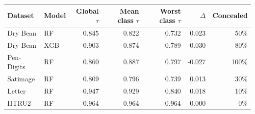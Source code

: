 \begin{tabular}{llrrrrr}
\toprule
Dataset & Model & Global $\tau$ & Mean class $\tau$ & Worst class $\tau$ & $\Delta$ & Concealed \\
\midrule
Dry Bean & RF & 0.845 & 0.822 & 0.732 & 0.023 & 50\% \\
Dry Bean & XGB & 0.903 & 0.874 & 0.789 & 0.030 & 80\% \\
\midrule
Pen-Digits & RF & 0.860 & 0.887 & 0.797 & -0.027 & 100\% \\
\midrule
Satimage & RF & 0.809 & 0.796 & 0.739 & 0.013 & 30\% \\
\midrule
Letter & RF & 0.947 & 0.929 & 0.840 & 0.018 & 10\% \\
\midrule
HTRU2 & RF & 0.964 & 0.964 & 0.964 & 0.000 & 0\% \\
\bottomrule
\end{tabular}
